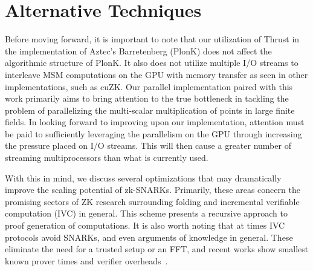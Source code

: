 \documentclass[sigconf]{acmart}
\begin{document}

\section{Alternative Techniques}
\label{sec:improvement}
Before moving forward, it is important to note that our utilization of Thrust in the implementation of Aztec's Barretenberg (PlonK) does not affect the algorithmic structure of PlonK. It also does not utilize multiple I/O streams to interleave MSM computations on the GPU with memory transfer as seen in other implementations, such as cuZK\cite{MSMGPU22}. Our parallel implementation paired with this work primarily aims to bring attention to the true bottleneck in tackling the problem of parallelizing the multi-scalar multiplication of points in large finite fields. In looking forward to improving upon our implementation, attention must be paid to sufficiently leveraging the parallelism on the GPU through increasing the pressure placed on I/O streams. This will then cause a greater number of streaming multiprocessors than what is currently used.

With this in mind, we discuss several optimizations that may dramatically improve the scaling potential of zk-SNARKs. Primarily, these areas concern the promising sectors of ZK research surrounding folding and incremental verifiable computation (IVC) in general. This scheme presents a recursive approach to proof generation of computations. It is also worth noting that at times IVC protocols avoid SNARKs, and even arguments of knowledge in general. These eliminate the need for a trusted setup or an FFT, and recent works show smallest known prover times and verifier overheads~\cite{ZKfolding,Mangrove}.
\end{document}
